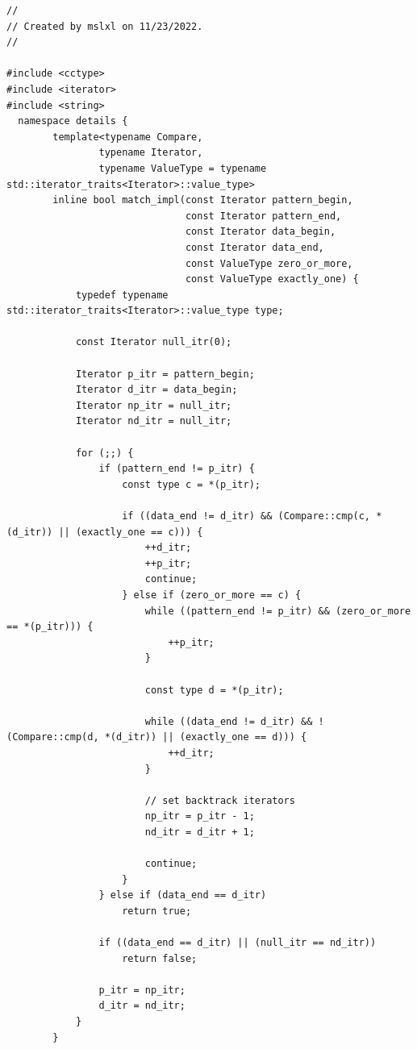 \documentclass{ctexrep}
\begin{document}
\begin{verbatim}
//
// Created by mslxl on 11/23/2022.
//

#include <cctype>
#include <iterator>
#include <string>
  namespace details {
        template<typename Compare,
                typename Iterator,
                typename ValueType = typename std::iterator_traits<Iterator>::value_type>
        inline bool match_impl(const Iterator pattern_begin,
                               const Iterator pattern_end,
                               const Iterator data_begin,
                               const Iterator data_end,
                               const ValueType zero_or_more,
                               const ValueType exactly_one) {
            typedef typename std::iterator_traits<Iterator>::value_type type;

            const Iterator null_itr(0);

            Iterator p_itr = pattern_begin;
            Iterator d_itr = data_begin;
            Iterator np_itr = null_itr;
            Iterator nd_itr = null_itr;

            for (;;) {
                if (pattern_end != p_itr) {
                    const type c = *(p_itr);

                    if ((data_end != d_itr) && (Compare::cmp(c, *(d_itr)) || (exactly_one == c))) {
                        ++d_itr;
                        ++p_itr;
                        continue;
                    } else if (zero_or_more == c) {
                        while ((pattern_end != p_itr) && (zero_or_more == *(p_itr))) {
                            ++p_itr;
                        }

                        const type d = *(p_itr);

                        while ((data_end != d_itr) && !(Compare::cmp(d, *(d_itr)) || (exactly_one == d))) {
                            ++d_itr;
                        }

                        // set backtrack iterators
                        np_itr = p_itr - 1;
                        nd_itr = d_itr + 1;

                        continue;
                    }
                } else if (data_end == d_itr)
                    return true;

                if ((data_end == d_itr) || (null_itr == nd_itr))
                    return false;

                p_itr = np_itr;
                d_itr = nd_itr;
            }
        }


\end{verbatim}
\end{document}
